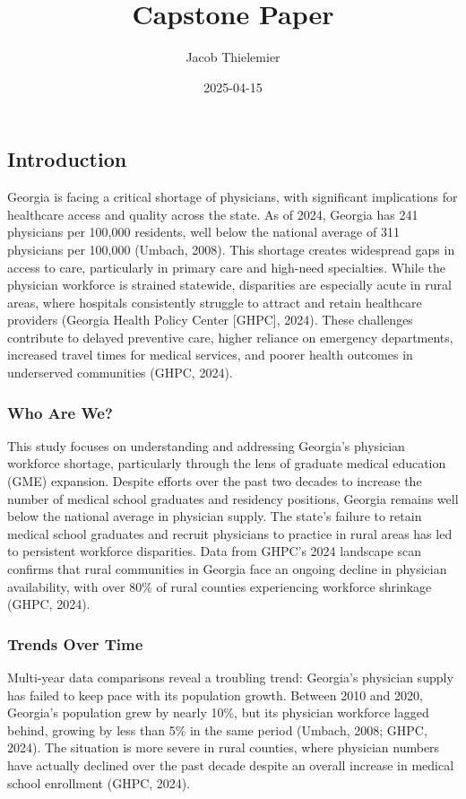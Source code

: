 \documentclass[
]{article}
\title{Capstone Paper}
\author{Jacob Thielemier}
\date{2025-04-15}
\begin{document}
\maketitle

\subsection{Introduction}\label{introduction}

Georgia is facing a critical shortage of physicians, with significant
implications for healthcare access and quality across the state. As of
2024, Georgia has 241 physicians per 100,000 residents, well below the
national average of 311 physicians per 100,000 (Umbach, 2008). This
shortage creates widespread gaps in access to care, particularly in
primary care and high-need specialties. While the physician workforce is
strained statewide, disparities are especially acute in rural areas,
where hospitals consistently struggle to attract and retain healthcare
providers (Georgia Health Policy Center {[}GHPC{]}, 2024). These
challenges contribute to delayed preventive care, higher reliance on
emergency departments, increased travel times for medical services, and
poorer health outcomes in underserved communities (GHPC, 2024).

\subsubsection{Who Are We?}\label{who-are-we}

This study focuses on understanding and addressing Georgia's physician
workforce shortage, particularly through the lens of graduate medical
education (GME) expansion. Despite efforts over the past two decades to
increase the number of medical school graduates and residency positions,
Georgia remains well below the national average in physician supply. The
state's failure to retain medical school graduates and recruit
physicians to practice in rural areas has led to persistent workforce
disparities. Data from GHPC's 2024 landscape scan confirms that rural
communities in Georgia face an ongoing decline in physician
availability, with over 80\% of rural counties experiencing workforce
shrinkage (GHPC, 2024).

\subsubsection{Trends Over Time}\label{trends-over-time}

Multi-year data comparisons reveal a troubling trend: Georgia's
physician supply has failed to keep pace with its population growth.
Between 2010 and 2020, Georgia's population grew by nearly 10\%, but its
physician workforce lagged behind, growing by less than 5\% in the same
period (Umbach, 2008; GHPC, 2024). The situation is more severe in rural
counties, where physician numbers have actually declined over the past
decade despite an overall increase in medical school enrollment (GHPC,
2024).
\end{document}
